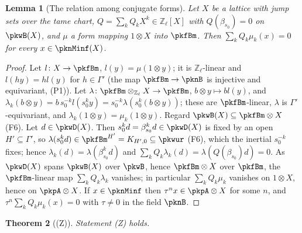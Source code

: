 \documentclass[10pt]{amsart}
\newtheorem{theorem}{Theorem}[section]
\newtheorem{lemma}[theorem]{Lemma}
\theoremstyle{definition}
\theoremstyle{remark}
\newcommand{\Z}{\mathbb Z}
\begin{document}
\begin{lemma}[The relation among conjugate forms]\label{pkw:rel}
Let $X$ be a lattice with jump sets over the tame chart, $Q=\sum_kQ_kX^k\in\Z_\ell[X]$ with $Q(\beta_{s_0})=0$ on
$\pkwB(X)$, and $\mu$ a form mapping $1\otimes X$ into $\pkfBm$. Then $\sum_kQ_k\mu_k(x)=0$ for every $x\in\pknMinf(X)$.
\end{lemma}

\begin{proof}
Let $l\colon X\to\pkfBm$, $l(y)=\mu(1\otimes y)$; it is $\Z_\ell$-linear and $l(hy)=hl(y)$ for $h\in\Gamma'$ (the map
$\pkfBm\to\pknB$ is injective and equivariant, (P1)). Let $\lambda\colon\pkfBm\otimes_{\Z_\ell}X\to\pkfBm$,
$b\otimes y\mapsto bl(y)$, and $\lambda_k(b\otimes y)=b\,s_0^{-k}l(s_0^ky)=s_0^{-k}\lambda(s_0^k(b\otimes y))$; these are
$\pkfBm$-linear, $\lambda$ is $\Gamma'$-equivariant, and $\lambda_k(1\otimes y)=\mu_k(1\otimes y)$. Regard
$\pkwB(X)\subseteq\pkfBm\otimes X$ (F6). Let $d\in\pkwD(X)$. Then $s_0^kd=\beta^k_{s_0}d\in\pkwD(X)$ is fixed by an open
$H'\subseteq\Gamma'$, so $\lambda(s_0^kd)\in\pkfBm^{H'}=K_{H',0}\subseteq\pkwur$ (F6), which the inertial $s_0^{-k}$ fixes;
hence $\lambda_k(d)=\lambda(\beta_{s_0}^kd)$ and $\sum_kQ_k\lambda_k(d)=\lambda(Q(\beta_{s_0})d)=0$. As $\pkwD(X)$ spans
$\pkwB(X)$ over $\pkwB$, hence $\pkfBm\otimes X$ over $\pkfBm$, the $\pkfBm$-linear map $\sum_kQ_k\lambda_k$ vanishes; in
particular $\sum_kQ_k\mu_k$ vanishes on $1\otimes X$, hence on $\pkpA\otimes X$. If $x\in\pknMinf$ then $\tau^nx\in
\pkpA\otimes X$ for some $n$, and $\tau^n\sum_kQ_k\mu_k(x)=0$ with $\tau\ne0$ in the field $\pknB$.
\end{proof}

\begin{theorem}[(Z)]\label{pkw:Z}
Statement (Z) holds.
\end{theorem}
\end{document}
